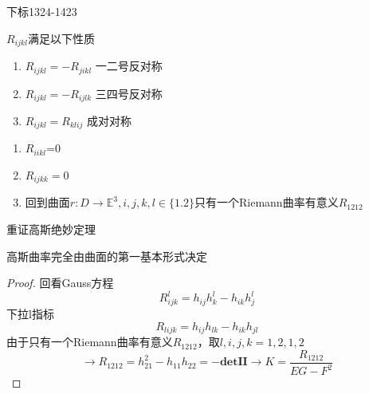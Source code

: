 \documentclass[lang=cn,10pt,thmcnt=section]{elegantbook}
\begin{document}
\begin{remark}
    
    下标1324-1423
\end{remark}

\begin{proposition}
    $R_{ijkl}$满足以下性质
    \begin{enumerate}
        \item $R_{ijkl}=-R_{jikl}$ 一二号反对称
        \item $R_{ijkl}=-R_{ijlk}$ 三四号反对称
        \item $R_{ijkl}=R_{klij}$ 成对对称
    \end{enumerate}
\end{proposition}
\begin{corollary}
    \begin{enumerate}
        \item $ R_{iikl}$=0
        \item $ R_{ijkk}=0$
        \item 回到曲面$r:D\rightarrow \mathbb{E}^3,i,j,k,l\in\{1.2\}$只有一个Riemann曲率有意义$R_{1212}$
    \end{enumerate}
\end{corollary}

重证高斯绝妙定理
\begin{theorem}
高斯曲率完全由曲面的第一基本形式决定
\end{theorem}
\begin{proof}
    回看Gauss方程
    \[R_{ijk}^l=h_{ij}h^l_k-h_{ik}h^l_j\]
    下拉l指标
    \[R_{lijk}=h_{ij}h_{lk}-h_{ik}h_{jl}\]
    由于只有一个Riemann曲率有意义$R_{1212}$，取$l,i,j,k=1,2,1,2$
    \[\rightarrow R_{1212}=h^2_{21}-h_{11}h_{22}=-\mathbf{det II}\rightarrow K=\frac{R_{1212}}{EG-F^2}
    \]
\end{proof}
\end{document}

